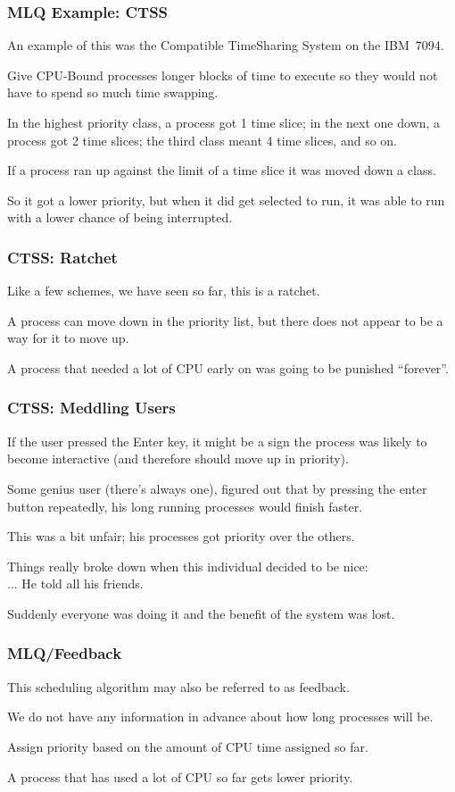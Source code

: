\begin{frame}
\frametitle{MLQ Example: CTSS}

An example of this was the Compatible TimeSharing System on the IBM~7094. 

Give CPU-Bound processes longer blocks of time to execute so they would not have to spend so much time swapping. 

In the highest priority class, a process got 1 time slice; in the next one down, a process got 2 time slices; the third class meant 4 time slices, and so on. 

If a process ran up against the limit of a time slice it was moved down a class. 

So it got a lower priority, but when it did get selected to run, it was able to run with a lower chance of being interrupted.


\end{frame}

\begin{frame}
\frametitle{CTSS: Ratchet}

Like a few schemes, we have seen so far, this is a ratchet. 

A process can move down in the priority list, but there does not appear to be a way for it to move up. 

A process that needed a lot of CPU early on was going to be punished ``forever''.


\end{frame}

\begin{frame}
\frametitle{CTSS: Meddling Users}

If the user pressed the Enter key, it might be a sign the process was likely to become interactive (and therefore should move up in priority). 

Some genius user (there's always one), figured out that by pressing the enter button repeatedly, his long running processes would finish faster. 

This was a bit unfair; his processes got priority over the others. 

Things really broke down when this individual decided to be nice:\\
\quad ... He told all his friends. 

Suddenly everyone was doing it and the benefit of the system was lost.


\end{frame}

\begin{frame}
\frametitle{MLQ/Feedback}

This scheduling algorithm may also be referred to as \alert{feedback}. 

We do not have any information in advance about how long processes will be. 

Assign priority based on the amount of CPU time assigned so far. 

A process that has used a lot of CPU so far gets lower priority.


\end{frame}

